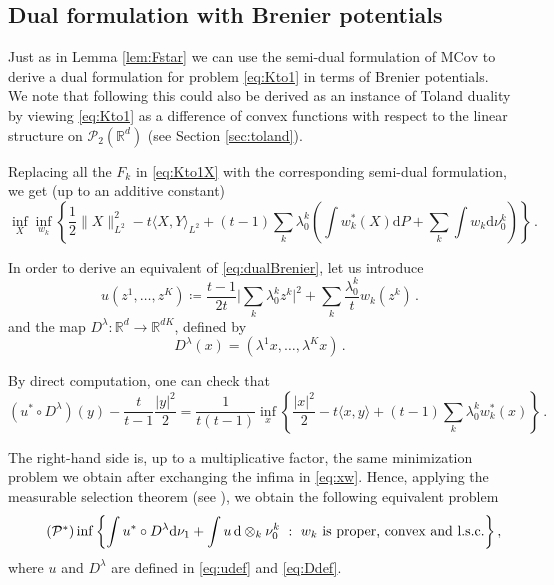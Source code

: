 \documentclass[12pt]{amsart}
\numberwithin{equation}{section}
\let\mc=\mathcal
\let\mr=\mathrm
\def\ed{\mathrm{d}}
\theoremstyle{plain}
\theoremstyle{definition}
\begin{document}
\subsection{Dual formulation with Brenier potentials} Just as in Lemma \ref{lem:Fstar} we can use the semi-dual formulation of $\mr{MCov}$ to derive a dual formulation for problem \eqref{eq:Kto1} in terms of Brenier potentials. We note that following \cite{carlier2008Toland,gallouet2025metric} this could also be derived as an instance of Toland duality by viewing \eqref{eq:Kto1} as a difference of convex functions with respect to the linear structure on $\mc{P}_2(\mathbb{R}^d)$ (see Section \ref{sec:toland}).

Replacing all the $F_k$ in \eqref{eq:Kto1X} with the corresponding semi-dual formulation, we get (up to an additive constant)
\begin{equation}\label{eq:xw}
\inf_X \inf_{w_k} \left\{ \frac{1}{2} \|X\|^2_{L^2} - t \langle X,Y\rangle_{L^2}  +  (t-1)\sum_k \lambda^k_0\left( \int w_k^*(X)\ed P + \sum_{k} \int w_k \ed \nu_0^k  \right)\right\}\,.
\end{equation}

In order to derive an equivalent of \eqref{eq:dualBrenier}, let us introduce
\begin{equation}\label{eq:udef}
u(z^1, \ldots, z^K) \coloneqq  \frac{t-1}{2t} \Big|\sum_k \lambda^k_0 {z^k} \Big|^2 + \sum_k \frac{\lambda^k_0}{t} w_k(z^k)\,.
\end{equation}
and the map $D^\lambda: \mathbb{R}^d \rightarrow \mathbb{R}^{dK}$, defined by
\begin{equation}\label{eq:Ddef}
D^\lambda(x) = \left(\lambda^1 x, \ldots, \lambda^K x \right) \,.
\end{equation}

By direct computation, one can check that
\begin{equation}\label{eq:ustarD}
(u^*\circ D^\lambda )(y) - \frac{t}{t-1}\frac{|y|^2}{2}= \frac{1}{t(t-1)} \inf_x \left\{ \frac{|x|^2}{2} - t \langle x,y \rangle + (t-1) \sum_k \lambda_0^k w_k^*(x) \right\}\,.
\end{equation}

The right-hand side is, up to a multiplicative factor, the same minimization problem we obtain after exchanging the infima in \eqref{eq:xw}.
Hence, applying the measurable selection theorem (see \cite[Lemma B.2]{aubin2026debiasing}), we obtain the following equivalent problem
\begin{equation}\label{eq:dualBreniermm} \tag{${\mc{P}}^*$}
\inf \left \{ \int u^* \circ D^\lambda \ed \nu_1  + \int u \, \ed \otimes_k \nu_0^k ~:~ w_k \text{ is proper, convex and l.s.c.} \right\},
\end{equation}
where $u$ and $D^\lambda$ are defined in \eqref{eq:udef} and \eqref{eq:Ddef}. 
\end{document}
